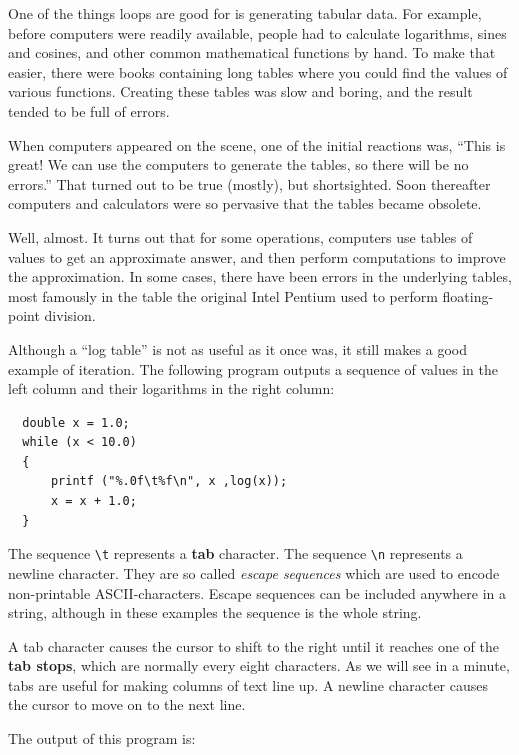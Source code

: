 One of the things loops are good for is generating
tabular data.  For example, before computers were readily available,
people had to calculate logarithms, sines and cosines, and other
common mathematical functions by hand.
To make that easier, there were books containing long tables
where you could find the values of various functions.
Creating these tables was slow and boring, and the result
tended to be full of errors.

When computers appeared on the scene, one of the initial reactions
was, ``This is great!  We can use the computers to generate the
tables, so there will be no errors.''  That turned out to be true
(mostly), but shortsighted.  Soon thereafter computers and
calculators were so pervasive that the tables became obsolete.

Well, almost.  It turns out that for some operations, computers
use tables of values to get an approximate answer, and then
perform computations to improve the approximation.  In some
cases, there have been errors in the underlying tables, most
famously in the table the original Intel Pentium used to perform
floating-point division.


Although a ``log table'' is not as useful as it once was, it still
makes a good example of iteration.  The following program outputs a
sequence of values in the left column and their logarithms in the
right column:

\begin{verbatim}
  double x = 1.0;
  while (x < 10.0) 
  {
      printf ("%.0f\t%f\n", x ,log(x));
      x = x + 1.0;
  }
\end{verbatim}
%
The sequence \verb+\t+ represents a {\bf tab} character.
The sequence \verb+\n+ represents a newline character.  
They are so called \emph{escape sequences} which are used to encode
non-printable ASCII-characters.
Escape sequences can be included anywhere in a string, although in these examples
the sequence is the whole string.

A tab character causes the cursor to shift to the right until
it reaches one of the {\bf tab stops}, which are normally every
eight characters.  As we will see in a minute, tabs are useful
for making columns of text line up.
A newline character causes the cursor to move on to the next line.  

The output of this program is:

